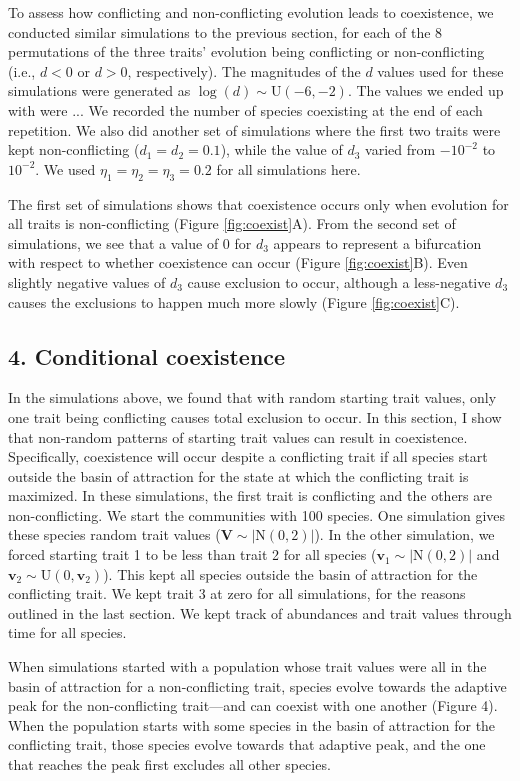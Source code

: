 To assess how conflicting and non-conflicting evolution leads to coexistence,
we conducted similar simulations to the previous section, for each of the
8 permutations of the three traits' evolution being conflicting or
non-conflicting (i.e., $d < 0$ or $d > 0$, respectively).
The magnitudes of the $d$ values used for these simulations were generated as
$\log(d) \sim \text{U}(-6, -2)$.
The values we ended up with were %
...
% 
We recorded the number of species coexisting at the end of each repetition.
We also did another set of simulations where the first two traits were kept
non-conflicting ($d_1 = d_2 = 0.1$), while the value of $d_3$ varied
from $-10^{-2}$ to $10^{-2}$.
We used $\eta_1 = \eta_2 = \eta_3 = 0.2$ for all simulations here.

The first set of simulations shows that
coexistence occurs only when evolution for all traits is non-conflicting
(Figure \ref{fig:coexist}A).
From the second set of simulations, we see that a value of 0 for $d_3$
appears to represent a bifurcation with respect to whether
coexistence can occur (Figure \ref{fig:coexist}B).
Even slightly negative values of $d_3$ cause exclusion to occur, although
a less-negative $d_3$ causes the exclusions to happen much more slowly
(Figure \ref{fig:coexist}C).






\subsection*{4. Conditional coexistence}

In the simulations above, we found that with random starting trait values,
only one trait being conflicting causes total exclusion to occur.
In this section, I show that non-random patterns of starting trait values
can result in coexistence.
Specifically, coexistence will occur despite a conflicting trait if all
species start outside the basin of attraction for the state at which
the conflicting trait is maximized.
In these simulations, the first trait is conflicting and the others
are non-conflicting.
We start the communities with 100 species.
One simulation gives these species random trait values
($\mathbf{V} \sim |\text{N}(0,2)|$).
In the other simulation, we forced starting trait 1 to be less than trait 2
for all species ($\mathbf{v}_1 \sim |\text{N}(0,2)|$ and
$\mathbf{v}_2 \sim \text{U}(0, \mathbf{v}_2)$).
This kept all species outside the basin of attraction for the conflicting trait.
We kept trait 3 at zero for all simulations, for the reasons outlined in
the last section.
We kept track of abundances and trait values through time for all species.



When simulations started with a population whose trait values were all in the
basin of attraction for a non-conflicting trait, species evolve towards the
adaptive peak for the non-conflicting trait---and can coexist with one another
(Figure 4).
When the population starts with some species in the basin of attraction for
the conflicting trait, those species evolve towards that adaptive peak, and
the one that reaches the peak first excludes all other species.
